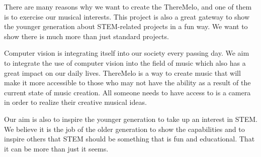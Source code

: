 
There are many reasons why we want to create the ThereMelo, and one of them is to exercise our musical interests. This project is also a great gateway to show the younger generation about STEM-related projects in a fun way. We want to show there is much more than just standard projects. 

Computer vision is integrating itself into our society every passing day. We aim to integrate the use of computer vision into the field of music which also has a great impact on our daily lives. ThereMelo is a way to create music that will make it more accessible to those who may not have the ability as a result of the current state of music creation. All someone needs to have access to is a camera in order to realize their creative musical ideas.

Our aim is also to inspire the younger generation to take up an interest in STEM. We believe it is the job of the older generation to show the capabilities and to inspire others that STEM should be something that is fun and educational. That it can be more than just it seems.